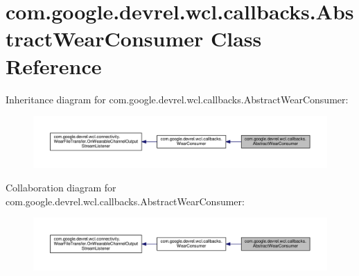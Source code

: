 \hypertarget{classcom_1_1google_1_1devrel_1_1wcl_1_1callbacks_1_1AbstractWearConsumer}{}\section{com.\+google.\+devrel.\+wcl.\+callbacks.\+Abstract\+Wear\+Consumer Class Reference}
\label{classcom_1_1google_1_1devrel_1_1wcl_1_1callbacks_1_1AbstractWearConsumer}


Inheritance diagram for com.\+google.\+devrel.\+wcl.\+callbacks.\+Abstract\+Wear\+Consumer\+:\nopagebreak
\begin{figure}[H]
\begin{center}
\leavevmode
\includegraphics[width=350pt]{dc/d2d/classcom_1_1google_1_1devrel_1_1wcl_1_1callbacks_1_1AbstractWearConsumer__inherit__graph}
\end{center}
\end{figure}


Collaboration diagram for com.\+google.\+devrel.\+wcl.\+callbacks.\+Abstract\+Wear\+Consumer\+:\nopagebreak
\begin{figure}[H]
\begin{center}
\leavevmode
\includegraphics[width=350pt]{d1/dfe/classcom_1_1google_1_1devrel_1_1wcl_1_1callbacks_1_1AbstractWearConsumer__coll__graph}
\end{center}
\end{figure}
